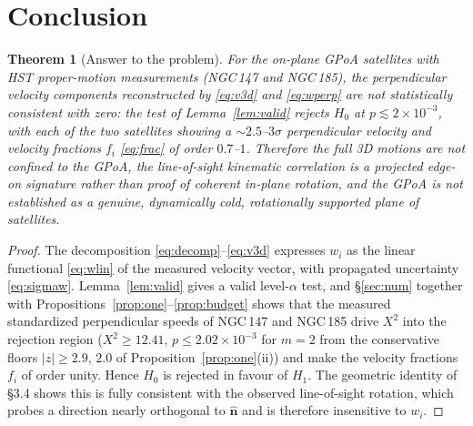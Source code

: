 \documentclass{amsart}
\newtheorem{theorem}{Theorem}
\theoremstyle{definition}
\begin{document}
\section{Conclusion}

\begin{theorem}[Answer to the problem]\label{thm:main}
For the on-plane GPoA satellites with HST proper-motion measurements
(NGC\,147 and NGC\,185), the perpendicular velocity components reconstructed
by \eqref{eq:v3d} and \eqref{eq:wperp} are \emph{not} statistically
consistent with zero: the test of Lemma~\ref{lem:valid} rejects $H_0$ at
$p\lesssim 2\times10^{-3}$, with each of the two satellites showing a
$\sim 2.5$--$3\sigma$ perpendicular velocity and velocity fractions $f_i$
\eqref{eq:frac} of order $0.7$--$1$. Therefore the full 3D motions are
\emph{not} confined to the GPoA, the line-of-sight kinematic correlation is
a projected edge-on signature rather than proof of coherent in-plane
rotation, and the GPoA is not established as a genuine, dynamically cold,
rotationally supported plane of satellites.
\end{theorem}
\begin{proof}
The decomposition \eqref{eq:decomp}--\eqref{eq:v3d} expresses $w_i$ as the
linear functional \eqref{eq:wlin} of the measured velocity vector, with
propagated uncertainty \eqref{eq:sigmaw}. Lemma~\ref{lem:valid} gives a
valid level-$\alpha$ test, and \S\ref{sec:num} together with
Propositions~\ref{prop:one}--\ref{prop:budget} shows that the measured
standardized perpendicular speeds of NGC\,147 and NGC\,185 drive $X^2$ into
the rejection region ($X^2\ge 12.41$, $p\le 2.02\times10^{-3}$ for $m=2$ from
the conservative floors $|z|\ge 2.9,\,2.0$ of Proposition~\ref{prop:one}(ii))
and make the velocity fractions $f_i$ of order unity. Hence $H_0$ is rejected in
favour of $H_1$. The geometric identity of \S3.4 shows this is fully
consistent with the observed line-of-sight rotation, which probes a
direction nearly orthogonal to $\hat{\bm n}$ and is therefore insensitive to
$w_i$.
\end{proof}
\end{document}
